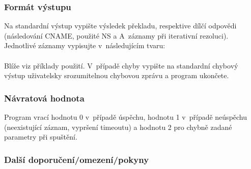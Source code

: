 \documentclass[11pt, a4paper, titlepage]{article}
\begin{document}
\subsubsection*{Formát výstupu}

Na standardní výstup vypište výsledek překladu, respektive dílčí odpovědi (následování CNAME, použité NS a A~záznamy při iterativní rezoluci). Jednotlivé záznamy vypisujte v~následujícím tvaru: \\

 \\

Blíže viz příklady použití. V~případě chyby vypište na standardní chybový výstup uživatelsky srozumitelnou chybovou zprávu a program ukončete.


\subsubsection*{Návratová hodnota}

Program vrací hodnotu 0 v~případě úspěchu, hodnotu 1 v~případě neúspěchu (neexistující záznam, vypršení timeoutu) a hodnotu 2 pro chybně zadané parametry při spuštění.


\subsubsection*{Další doporučení/omezení/pokyny}
\end{document}
